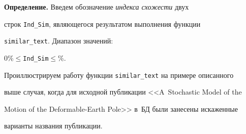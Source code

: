   \smallskip





  \noindent


  \textbf{Определение.} Введем обозначение \textit{индекса схожести} двух


строк \verb"Ind_Sim", являющегося результатом выполнения функции


\verb"similar_text". Диапазон значений:


0\%\;$\leq$\;\verb"Ind_Sim"\;$\leq$\%.


  \smallskip








  Проиллюстрируем работу функции \verb"similar_text" на примере описанного


выше случая, когда для исходной публикации <<A~Stochastic Model of the


Motion of the Deformable-Earth Pole>> в~БД были занесены искаженные


варианты названия публикации.





  \medskip





  \noindent


